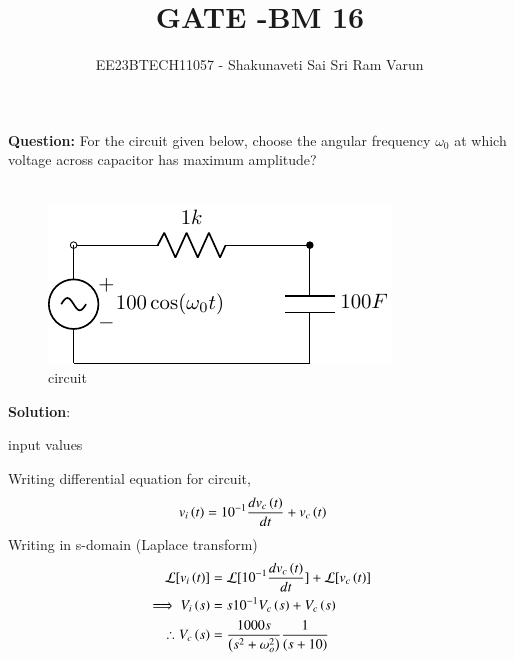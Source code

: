 \documentclass[journal,12pt,twocolumn]{IEEEtran}
\theoremstyle{remark}
\begin{document}

\vspace{3cm}

\title{GATE -BM 16}
\author{EE23BTECH11057 - Shakunaveti Sai Sri Ram Varun$^{}$%
}
\maketitle
\newpage
\bigskip
\vspace{2cm}
\textbf{Question: }
For the circuit given below, choose the angular frequency $ \omega_0$ at which voltage across capacitor has maximum amplitude?\\\\
\begin{figure}[h!]
    \includegraphics[width = \columnwidth]{figs/c_fig1.pdf}
    \caption{circuit }
    \centering
    \label{fig: bm_16_fig_1}
\end{figure}
\textbf{Solution}:\\
\begin{table}[htbp] 
\centering

\caption{input values}
\label{tab: table-bm16}
\end{table}
Writing differential equation for circuit,
\begin{align}
v_i\left(t\right) &= 10^{-1}\frac{dv_c\left(t\right)}{dt} + v_c\left(t\right)
\end{align}
Writing in s-domain (Laplace transform)
\begin{align}
\mathcal{L}[v_i\left(t\right)] &= \mathcal{L}[10^{-1}\frac{dv_c\left(t\right)}{dt}] + \mathcal{L}[v_c\left(t\right)]\\
\implies V_i\left(s\right) &= s10^{-1}V_c\left(s\right) + V_c\left(s\right)\\
\therefore V_c\left(s\right) &= \frac{1000s}{\left(s^2+ \omega_o^2\right)}\frac{1}{(s+10)}
\end{align}
\end{document}
